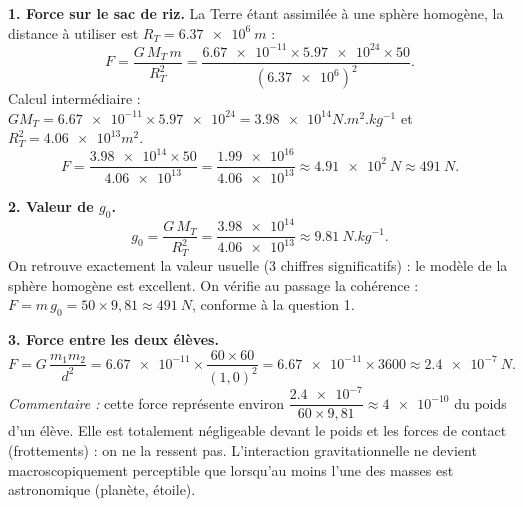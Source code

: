 \documentclass[11pt]{article}
\begin{document}
\begin{corrige}
\textbf{1. Force sur le sac de riz.} La Terre étant assimilée à une sphère homogène, la distance à utiliser est $R_T = \SI{6,37e6}{m}$ :
\[
F = \frac{G\,M_T\,m}{R_T^2} = \frac{\num{6,67e-11}\times\num{5,97e24}\times 50}{(\num{6,37e6})^2}.
\]
Calcul intermédiaire : $G M_T = \num{6,67e-11}\times\num{5,97e24} = \num{3,98e14}{N.m^2.kg^{-1}}$ et $R_T^2 = \num{4,06e13}{m^2}$.
\[
F = \frac{\num{3,98e14}\times 50}{\num{4,06e13}} = \frac{\num{1,99e16}}{\num{4,06e13}} \approx \SI{4,91e2}{N} \approx \SI{491}{N}.
\]

\textbf{2. Valeur de $g_0$.}
\[
g_0 = \frac{G\,M_T}{R_T^2} = \frac{\num{3,98e14}}{\num{4,06e13}} \approx \SI{9,81}{N.kg^{-1}}.
\]
On retrouve exactement la valeur usuelle (3 chiffres significatifs) : le modèle de la sphère homogène est excellent. On vérifie au passage la cohérence : $F = m\,g_0 = 50\times 9,81 \approx \SI{491}{N}$, conforme à la question 1.

\textbf{3. Force entre les deux élèves.}
\[
F = G\,\frac{m_1 m_2}{d^2} = \num{6,67e-11}\times\frac{60\times 60}{(1,0)^2} = \num{6,67e-11}\times 3600 \approx \SI{2,4e-7}{N}.
\]
\emph{Commentaire :} cette force représente environ $\dfrac{\num{2,4e-7}}{60\times 9,81} \approx \num{4e-10}$ du poids d'un élève. Elle est totalement négligeable devant le poids et les forces de contact (frottements) : on ne la ressent pas. L'interaction gravitationnelle ne devient macroscopiquement perceptible que lorsqu'au moins l'une des masses est astronomique (planète, étoile).
\end{corrige}
\end{document}
